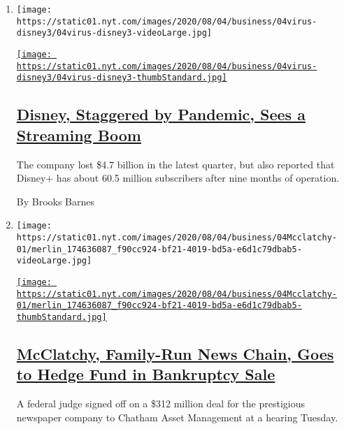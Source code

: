 \begin{enumerate}
\def\labelenumi{\arabic{enumi}.}
\item
  \texttt{[image: https://static01.nyt.com/images/2020/08/04/business/04virus-disney3/04virus-disney3-videoLarge.jpg]}

  \href{/2020/08/04/business/media/disney-earnings-coronavirus.html}{\texttt{[image: https://static01.nyt.com/images/2020/08/04/business/04virus-disney3/04virus-disney3-thumbStandard.jpg]}}

  \hypertarget{disney-staggered-by-pandemic-sees-a-streaming-boom}{%
  \subsection{\texorpdfstring{\href{/2020/08/04/business/media/disney-earnings-coronavirus.html}{Disney,
  Staggered by Pandemic, Sees a Streaming
  Boom}}{Disney, Staggered by Pandemic, Sees a Streaming Boom}}\label{disney-staggered-by-pandemic-sees-a-streaming-boom}}

  The company lost \$4.7 billion in the latest quarter, but also
  reported that Disney+ has about 60.5 million subscribers after nine
  months of operation.

  By Brooks Barnes
\item
  \texttt{[image: https://static01.nyt.com/images/2020/08/04/business/04Mcclatchy-01/merlin\_174636087\_f90cc924-bf21-4019-bd5a-e6d1c79dbab5-videoLarge.jpg]}

  \href{/2020/08/04/business/media/mcclatchy-newspapers-bankrutpcy-chatham.html}{\texttt{[image: https://static01.nyt.com/images/2020/08/04/business/04Mcclatchy-01/merlin\_174636087\_f90cc924-bf21-4019-bd5a-e6d1c79dbab5-thumbStandard.jpg]}}

  \hypertarget{mcclatchy-family-run-news-chain-goes-to-hedge-fund-in-bankruptcy-sale}{%
  \subsection{\texorpdfstring{\href{/2020/08/04/business/media/mcclatchy-newspapers-bankrutpcy-chatham.html}{McClatchy,
  Family-Run News Chain, Goes to Hedge Fund in Bankruptcy
  Sale}}{McClatchy, Family-Run News Chain, Goes to Hedge Fund in Bankruptcy Sale}}\label{mcclatchy-family-run-news-chain-goes-to-hedge-fund-in-bankruptcy-sale}}

  A federal judge signed off on a \$312 million deal for the prestigious
  newspaper company to Chatham Asset Management at a hearing Tuesday.


\end{enumerate}
